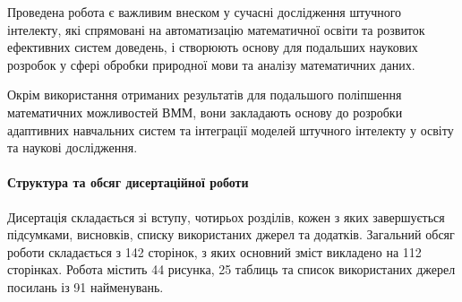 Проведена робота є важливим внеском у сучасні дослідження штучного інтелекту, які спрямовані на автоматизацію математичної освіти та розвиток ефективних систем доведень, і створюють основу для подальших наукових розробок у сфері обробки природної мови та аналізу математичних даних.

Окрім використання отриманих результатів для подальшого поліпшення математичних можливостей ВММ, вони закладають основу до розробки адаптивних навчальних систем та інтеграції моделей штучного інтелекту у освіту та наукові дослідження.

\paragraph{Структура та обсяг дисертаційної роботи}

Дисертація складається зі вступу, чотирьох розділів, кожен з яких завершується підсумками, висновків, списку використаних джерел та додатків. Загальний обсяг роботи складається з 142 сторінок, з яких основний зміст викладено на 112 сторінках. Робота містить 44 рисунка, 25 таблиць та список використаних джерел посилань із 91 найменувань.

\newpage